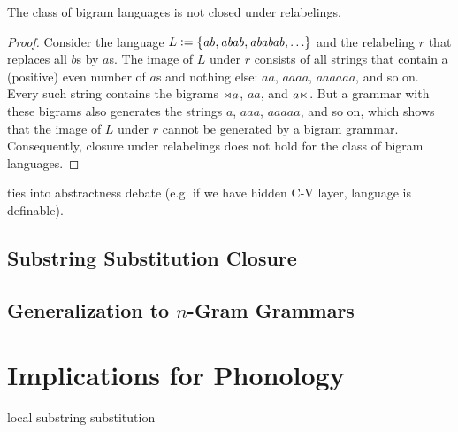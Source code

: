 \begin{lemma}
    The class of bigram languages is not closed under relabelings.
\end{lemma}
%
\begin{proof}
    Consider the language $L \mathrel{\mathop:}= \left \{ \mathit{ab}, \mathit{abab}, \mathit{ababab}, \ldots \right \}$ and the relabeling $r$ that replaces all $b$s by $a$s.
    The image of $L$ under $r$ consists of all strings that contain a (positive) even number of $a$s and nothing else: $\mathit{aa}$, $\mathit{aaaa}$, $\mathit{aaaaaa}$, and so on.
    Every such string contains the bigrams $\rtimes a$, $\mathit{aa}$, and $a \ltimes$.
    But a grammar with these bigrams also generates the strings $a$, $\mathit{aaa}$, $\mathit{aaaaa}$, and so on, which shows that the image of $L$ under $r$ cannot be generated by a bigram grammar.
    Consequently, closure under relabelings does not hold for the class of bigram languages.
\end{proof}
%
ties into abstractness debate (e.g. if we have hidden C-V layer, language is definable).

\subsection{Substring Substitution Closure}

\subsection{\texorpdfstring{Generalization to $n$-Gram Grammars}{Generalization to n-Gram Grammars}}

\section{Implications for Phonology}


local substring substitution

